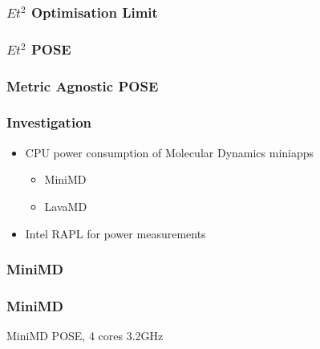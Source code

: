 \documentclass{beamer}
\begin{document}
  \begin{frame}
    \frametitle{$Et^2$ Optimisation Limit}
    \newcommand*{\OPTBOUND}{}%
    \newcommand*{\CONTBOUND}{}%
    \newcommand*{\OPTLIMIT}{}%
    \begin{figure}
    \centering
    
    \end{figure}
  \end{frame}

  \begin{frame}
    \frametitle{$Et^2$ POSE}
    \newcommand*{\OPTBOUND}{}%
    \newcommand*{\CONTBOUND}{}%
    \newcommand*{\OPTLIMIT}{}%
    \newcommand*{\POSELABELS}{}%
    \begin{figure}
    \centering
    
    \end{figure}
  \end{frame}




  \begin{frame}
    \frametitle{Metric Agnostic POSE}
    \begin{figure}
    \centering
    
    \end{figure}
  \end{frame}






  \begin{frame}
    \frametitle{Investigation}
    \begin{itemize}
      \item CPU power consumption of Molecular Dynamics miniapps
      \begin{itemize}
        \item MiniMD
        \item LavaMD
      \end{itemize}
      \item Intel RAPL for power measurements
    \end{itemize}
  \end{frame}



  \begin{frame}
    \frametitle{MiniMD}
    \begin{figure}
    \providecommand{\plotwidth}{.8\linewidth}
    
    \end{figure}
  \end{frame}
  \begin{frame}
    \frametitle{MiniMD}
    \begin{table}
    
    \caption{MiniMD POSE, 4 cores 3.2GHz}
    \end{table} 
  \end{frame}
\end{document}
